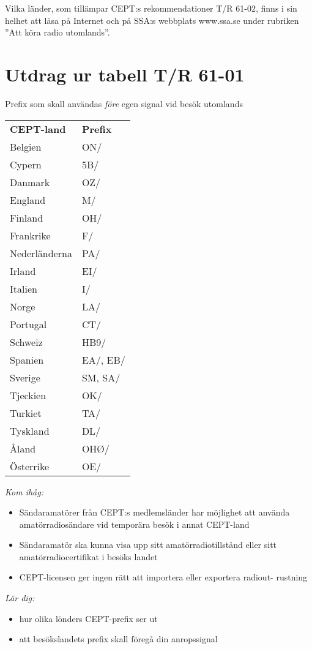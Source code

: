 Vilka länder, som tillämpar CEPT:s
rekommendationer T/R 61-02, finns i sin
helhet att läsa på Internet och på SSA:s
webbplats www.ssa.se under rubriken
”Att köra radio utomlands”.

\section{Utdrag ur tabell T/R 61-01}

Prefix som skall användas \textit{före} egen signal vid besök utomlands

\begin{tabular}{ll}
	\textbf{CEPT-land} & \textbf{Prefix} \\
	Belgien            &  ON/\\
	Cypern             &  5B/\\
	Danmark            &  OZ/\\
	England            &  M/\\
	Finland            &  OH/\\
	Frankrike          &  F/\\
	Nederländerna      &  PA/\\
	Irland             &  EI/\\
	Italien            &  I/\\
	Norge              &  LA/\\
	Portugal           &  CT/\\
	Schweiz            &  HB9/\\
	Spanien            &  EA/, EB/\\
	Sverige            &  SM, SA/\\
	Tjeckien           &  OK/\\
	Turkiet            &  TA/\\
	Tyskland           &  DL/\\
	Åland              &  OHØ/\\
	Österrike          &  OE/
\end{tabular}

\newpage

\emph{Kom ihåg:}

\begin{itemize}
	\item Sändaramatörer från CEPT:s medlemsländer har möjlighet att använda
	amatörradiosändare vid temporära besök i annat CEPT-land
	
	\item Sändaramatör ska kunna visa upp sitt amatörradiotillstånd eller
	sitt amatörradiocertifikat i besöks	landet
	
	\item CEPT-licensen ger ingen rätt att importera eller exportera radiout-
	rustning
\end{itemize}


\emph{Lär dig:}

\begin{itemize}
	\item hur olika lönders CEPT-prefix ser ut
	\item att besökslandets prefix skall föregå din anropssignal
\end{itemize}

